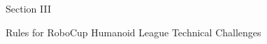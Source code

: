\documentclass[a4paper]{article}
\begin{document}

%



\clearpage

\begin{center}
\Huge\bfseries{
\vspace*{3cm}
Section III

\vspace*{2cm}

Rules for RoboCup Humanoid League Technical Challenges}
\end{center}







\end{document}
